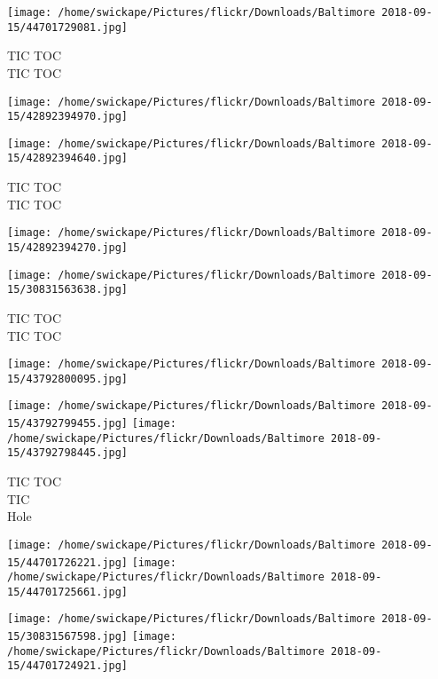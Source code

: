 \documentclass[10pt,letterpaper]{article}
\begin{document}
\vspace{0.25in}
\texttt{[image: /home/swickape/Pictures/flickr/Downloads/Baltimore 2018-09-15/44701729081.jpg]}

TIC TOC\\
TIC TOC\\
\pagebreak

\texttt{[image: /home/swickape/Pictures/flickr/Downloads/Baltimore 2018-09-15/42892394970.jpg]}

\vspace{0.25in}
\texttt{[image: /home/swickape/Pictures/flickr/Downloads/Baltimore 2018-09-15/42892394640.jpg]}

TIC TOC\\
TIC TOC\\
\pagebreak

\texttt{[image: /home/swickape/Pictures/flickr/Downloads/Baltimore 2018-09-15/42892394270.jpg]}

\vspace{0.25in}
\texttt{[image: /home/swickape/Pictures/flickr/Downloads/Baltimore 2018-09-15/30831563638.jpg]}

TIC TOC\\
TIC TOC\\
\pagebreak

\texttt{[image: /home/swickape/Pictures/flickr/Downloads/Baltimore 2018-09-15/43792800095.jpg]}

\vspace{0.25in}
\texttt{[image: /home/swickape/Pictures/flickr/Downloads/Baltimore 2018-09-15/43792799455.jpg]}
\texttt{[image: /home/swickape/Pictures/flickr/Downloads/Baltimore 2018-09-15/43792798445.jpg]}

TIC TOC\\
TIC\\
Hole\\
\pagebreak

\texttt{[image: /home/swickape/Pictures/flickr/Downloads/Baltimore 2018-09-15/44701726221.jpg]}
\texttt{[image: /home/swickape/Pictures/flickr/Downloads/Baltimore 2018-09-15/44701725661.jpg]}

\texttt{[image: /home/swickape/Pictures/flickr/Downloads/Baltimore 2018-09-15/30831567598.jpg]}
\texttt{[image: /home/swickape/Pictures/flickr/Downloads/Baltimore 2018-09-15/44701724921.jpg]}
\end{document}
